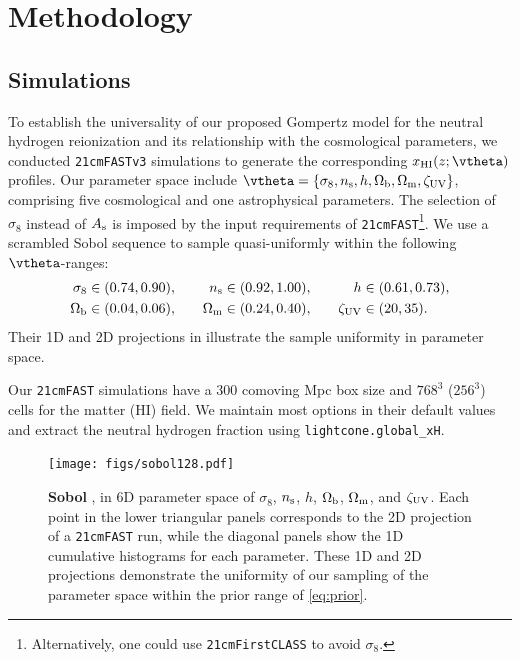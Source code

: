 \section*{Methodology}
\label{sec:methods}


\subsection*{Simulations}
\label{ssec:sims}

To establish the universality of our proposed Gompertz model for the
neutral hydrogen reionization and its relationship with the cosmological
parameters, we conducted  \texttt{21cmFASTv3} simulations to generate
the corresponding $x_\HI(z; \vtheta)$ profiles.
Our parameter space include $\vtheta = \{\sigma_8, \ns, h, \Omegab,
\Omegam, \zetaUV\}$, comprising five cosmological and one astrophysical
parameters.
The selection of $\sigma_8$ instead of $A_\mathrm{s}$ is imposed by the input
requirements of \texttt{21cmFAST}\footnote{Alternatively, one could use
\texttt{21cmFirstCLASS}\cite{Flitter2024} to avoid $\sigma_8$.}.
We  use a scrambled Sobol sequence \cite{Sobol1967, Owen1998}  to sample quasi-uniformly within the following
$\vtheta$-ranges:
%
\begin{alignat}{3}
\label{eq:prior}
\sigma_8 &\in (0.74, 0.90), &\quad
n_\mathrm{s} &\in (0.92, 1.00), &\quad
h &\in (0.61, 0.73), \nonumber\\
\Omega_\mathrm{b} &\in (0.04, 0.06), &\quad
\Omega_\mathrm{m} &\in (0.24, 0.40), &\quad
\zeta_\mathrm{UV} &\in (20, 35).
\end{alignat}
%
Their 1D and 2D projections in  illustrate the sample
uniformity in parameter space.

Our \texttt{21cmFAST} simulations have a 300 comoving Mpc box size and
$768^3$ ($256^3$) cells for the matter (HI) field.
We maintain most options in their default values and extract the
neutral hydrogen fraction using \texttt{lightcone.global\_xH}.

\begin{figure}[tb]
\centering
\texttt{[image: figs/sobol128.pdf]}
\caption{\textbf{Sobol },
in 6D parameter space of $\sigma_8$, $n_\mathrm{s}$, $h$, $\Omega_\mathrm{b}$, $\Omega_\mathrm{m}$,
and $\zeta_\mathrm{UV}$.
Each point in the lower triangular panels corresponds to the 2D
projection of a \texttt{21cmFAST} run, while the diagonal panels show
the 1D cumulative histograms for each parameter.
These 1D and 2D projections demonstrate the uniformity of our sampling
of the parameter space within the  prior range of \cref{eq:prior}.}
\label{fig:sobol}
\end{figure}

